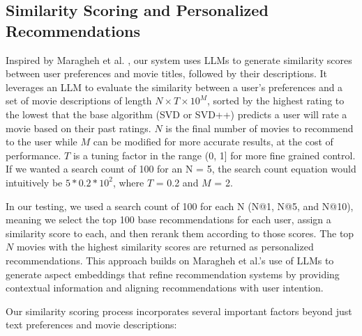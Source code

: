 \documentclass[sigconf]{acmart}
\begin{document}
\subsection{Similarity Scoring and Personalized Recommendations}
\label{sec:similar_scoring}
Inspired by Maragheh et al. \cite{yousefi2024llm}, our system uses LLMs to generate similarity scores between user preferences and movie titles, followed by their descriptions. It leverages an LLM to evaluate the similarity between a user's preferences and a set of movie descriptions of length \( N \times T \times 10^M \), sorted by the highest rating to the lowest that the base algorithm (SVD or SVD++) predicts a user will rate a movie based on their past ratings. \( N \) is the final number of movies to recommend to the user while \( M \) can be modified for more accurate results, at the cost of performance. \(T\) is a tuning factor in the range (0, 1] for more fine grained control. If we wanted a search count of 100 for an N = 5, the search count equation would intuitively be \(5 * 0.2 * 10^2\), where \(T\) = 0.2 and \(M\) = 2.

In our testing, we used a search count of 100 for each N (N@1, N@5, and N@10), meaning we select the top 100 base recommendations for each user, assign a similarity score to each, and then rerank them according to those scores. The top \( N \) movies with the highest similarity scores are returned as personalized recommendations. This approach builds on Maragheh et al.'s \cite{yousefi2024llm} use of LLMs to generate aspect embeddings that refine recommendation systems by providing contextual information and aligning recommendations with user intention.

Our similarity scoring process incorporates several important factors beyond just text preferences and movie descriptions:
\end{document}
